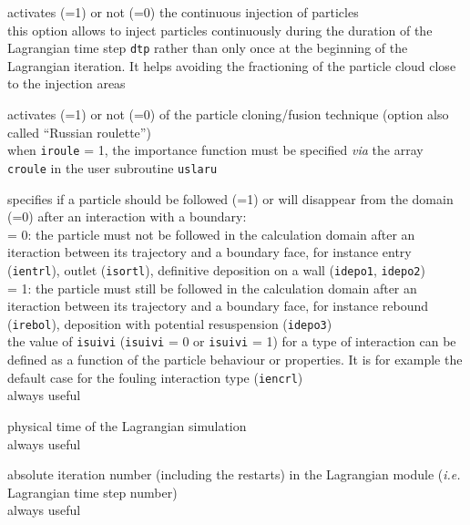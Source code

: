 {activates (=1) or not (=0) the continuous injection of particles\\
this option allows to inject particles continuously during the duration of the
Lagrangian time step \texttt{dtp} rather than only once at the
beginning of the Lagrangian iteration. It helps avoiding the fractioning of
the particle cloud close to the injection areas}

{activates (=1) or not (=0) of the particle cloning/fusion technique
(option also called ``Russian roulette'')\\
when \texttt{iroule} = 1, the importance function must be specified {\em via} the
array \texttt{croule} in the user subroutine \texttt{uslaru}}

{specifies if a particle should be followed (=1) or will disappear from the
domain (=0) after an interaction with a boundary:\\
\hspace*{1.3cm} = 0: the particle must not be followed in the
calculation domain after an iteraction between its trajectory and a
boundary face, for instance entry (\texttt{ientrl}), outlet (\texttt{isortl}),
definitive deposition on a wall (\texttt{idepo1}, \texttt{idepo2})\\
\hspace*{1.3cm} = 1: the particle must still be followed in the
calculation domain after an iteraction between its trajectory and a
boundary face, for instance rebound (\texttt{irebol}), deposition with potential
resuspension (\texttt{idepo3})\\
the value of \texttt{isuivi} (\texttt{isuivi} = 0 or \texttt{isuivi} = 1)
for a type of interaction can be defined as a function of the particle
behaviour or properties. It is for example the default case for the fouling
interaction type (\texttt{iencrl})\\
always useful}

{physical time of the Lagrangian simulation \\
always useful}

{absolute iteration number (including the restarts) in the Lagrangian
module ({\em i.e.} Lagrangian time step number) \\
always useful}


